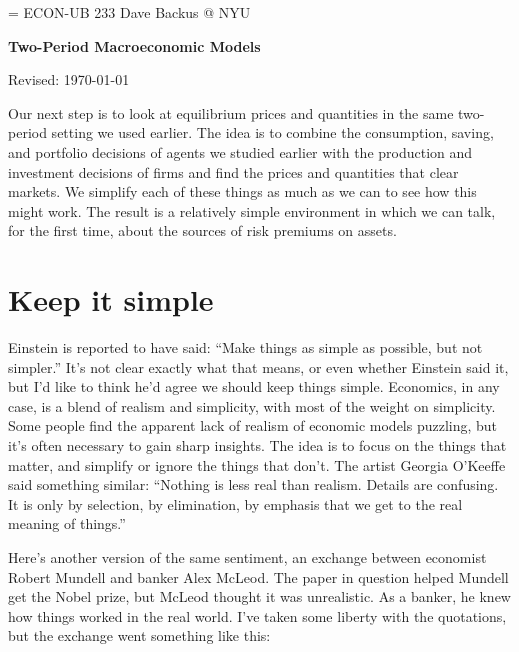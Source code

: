 \documentclass[11pt]{article}
\begin{document}
\parskip=\bigskipamount
\parindent=0.0in
\thispagestyle{empty}
{\large ECON-UB 233 \hfill Dave Backus @ NYU}

\bigskip\bigskip
\centerline{\Large \bf Two-Period Macroeconomic Models}
\centerline{Revised: \today}

\bigskip
Our next step is to look at equilibrium prices and quantities
in the same two-period setting we used earlier.
The idea is to combine the consumption,
saving, and portfolio decisions of agents we studied earlier
with the production and investment decisions of firms
and find the prices and quantities that clear markets.
We simplify each of these things as much as we can
to see how this might work.
The result is a relatively simple environment in which
we can talk, for the first time, about the sources
of risk premiums on assets.

\section{Keep it simple}

Einstein is reported to have said:
``Make things as simple as possible, but not simpler.''
It's not clear exactly what that means, or even whether Einstein said it,
but I'd like to think he'd agree we should keep things simple.
Economics, in any case, is a blend of realism and simplicity,
with most of the weight on simplicity.
Some people find the apparent lack of realism of economic models puzzling,
but it's often necessary to gain sharp insights.
The idea is to focus on the things that matter,
and simplify or ignore the things that don't.
The artist Georgia O'Keeffe said something similar:
``Nothing is less real than realism. Details are confusing. It is only by
selection, by elimination, by emphasis that we get to the real meaning of
things.''

Here's another version of the same sentiment,
an exchange between economist Robert Mundell and banker Alex McLeod.
The paper in question helped Mundell get the Nobel prize,
but McLeod thought it was unrealistic.
As a banker, he knew how things worked in the real world.
I've taken some liberty with the quotations, but the exchange went something like this:
\end{document}
